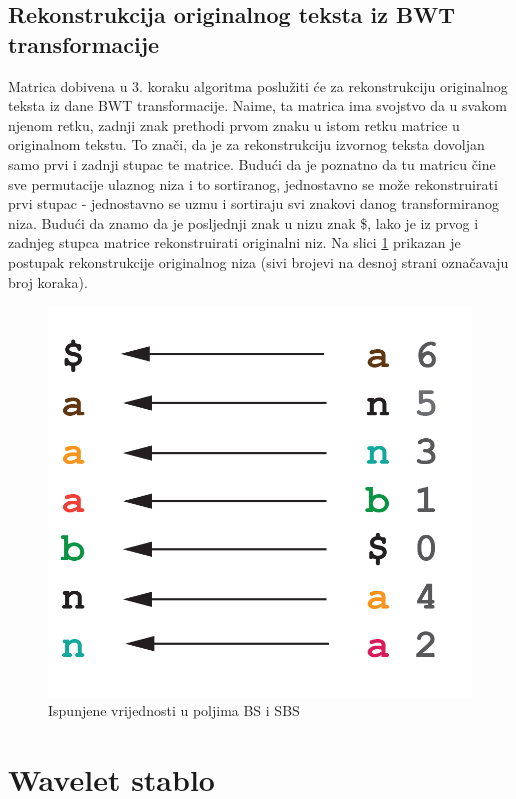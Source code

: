 \subsection{Rekonstrukcija originalnog teksta iz BWT transformacije}
Matrica dobivena u 3. koraku algoritma poslužiti će za rekonstrukciju originalnog teksta iz dane BWT transformacije. Naime, ta matrica ima svojstvo da u svakom njenom retku, zadnji znak prethodi prvom znaku u istom retku matrice u originalnom tekstu. To znači, da je za rekonstrukciju izvornog teksta dovoljan samo prvi i zadnji stupac te matrice. Budući da je poznatno da tu matricu čine sve permutacije ulaznog niza i to sortiranog, jednostavno se može rekonstruirati prvi stupac - jednostavno se uzmu i sortiraju svi znakovi danog transformiranog niza. Budući da znamo da je posljednji znak u nizu znak \$, lako je iz prvog i zadnjeg stupca matrice rekonstruirati originalni niz. Na slici \ref{bwt2} prikazan je postupak rekonstrukcije originalnog niza (sivi brojevi na desnoj strani označavaju broj koraka).

\begin{figure}[H]
\centering
\includegraphics[scale=0.2]{./pictures/reverseBWT.jpg}
\caption{Ispunjene vrijednosti u poljima BS i SBS}\label{bwt2}
\end{figure}



\section{Wavelet stablo}

